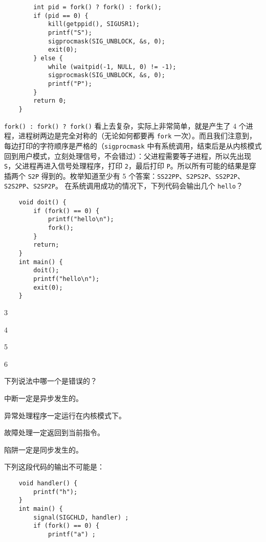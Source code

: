 \begin{problems}
\begin{verbatim}
        int pid = fork() ? fork() : fork();
        if (pid == 0) {
            kill(getppid(), SIGUSR1);
            printf("S");
            sigprocmask(SIG_UNBLOCK, &s, 0);
            exit(0);
        } else {
            while (waitpid(-1, NULL, 0) != -1);
            sigprocmask(SIG_UNBLOCK, &s, 0);
            printf("P");
        }
        return 0;
    }
        \end{verbatim}
        \sol \verb|fork() : fork() ? fork()| 看上去复杂，实际上非常简单，就是产生了 4 个进程，进程树两边是完全对称的（无论如何都要再 \verb|fork| 一次）。而且我们注意到，每边打印的字符顺序是严格的（\verb|sigprocmask| 中有系统调用，结束后是从内核模式回到用户模式，立刻处理信号，不会错过）：父进程需要等子进程，所以先出现 \verb|S|，父进程再进入信号处理程序，打印 \verb|2|，最后打印 \verb|P|。所以所有可能的结果是穿插两个 \verb|S2P| 得到的。枚举知道至少有 5 个答案：\verb|SS22PP|、\verb|S2PS2P|、\verb|SS2P2P|、\verb|S2S2PP|、\verb|S2SP2P|。
         在系统调用成功的情况下，下列代码会输出几个 \verb|hello|？
        \begin{verbatim}
    void doit() {
        if (fork() == 0) {
            printf("hello\n");
            fork();
        }
        return;
    }
    int main() {
        doit();
        printf("hello\n");
        exit(0);
    }
        \end{verbatim}
        \begin{choices}
            \item 3
            \item 4
            \item 5
            \item 6
        \end{choices}
         下列说法中哪一个是错误的？
        \begin{choices}
            \item 中断一定是异步发生的。
            \item 异常处理程序一定运行在内核模式下。
            \item 故障处理一定返回到当前指令。
            \item 陷阱一定是同步发生的。
        \end{choices}
         下列这段代码的输出不可能是：
        \begin{verbatim}
    void handler() {
        printf("h");
    }
    int main() {
        signal(SIGCHLD, handler) ;
        if (fork() == 0) {
            printf("a") ;

\end{verbatim}
\end{problems}
